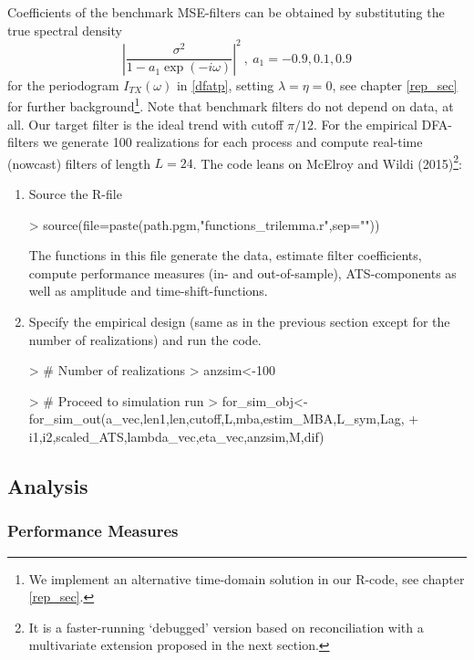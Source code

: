 \documentclass[a4paper]{book}
\begin{document}
Coefficients of the benchmark MSE-filters can be obtained by substituting the true spectral density
\[\left|\frac{\sigma^2}{1-a_1\exp(-i\omega)}\right|^2~,~a_1=-0.9,0.1,0.9\]
for the periodogram $I_{TX}(\omega)$ in \ref{dfatp}, setting $\lambda=\eta=0$, see chapter \ref{rep_sec} for further background\footnote{We implement an alternative time-domain solution in our R-code, see chapter \ref{rep_sec}.}. Note that benchmark filters do not depend on data, at all. Our target filter is the ideal trend with cutoff $\pi/12$.  
For the empirical DFA-filters we generate 100 realizations for each process and compute real-time (nowcast) filters of length $L=24$. The code leans on McElroy and Wildi (2015)\footnote{It is a faster-running `debugged' version based on reconciliation with a multivariate extension proposed in the next section.}:
\begin{enumerate}
\item Source the R-file
\begin{Schunk}
\begin{Sinput}
> source(file=paste(path.pgm,"functions_trilemma.r",sep=""))
\end{Sinput}
\end{Schunk}
The functions in this file generate the data, estimate filter coefficients, compute performance measures (in- and out-of-sample), ATS-components as well as amplitude and time-shift-functions. 
\item Specify the empirical design (same as in the previous section except for the number of realizations) and run the code. 
\begin{Schunk}
\begin{Sinput}
> # Number of realizations
> anzsim<-100
\end{Sinput}
\end{Schunk}
\begin{Schunk}
\begin{Sinput}
> # Proceed to simulation run
> for_sim_obj<-for_sim_out(a_vec,len1,len,cutoff,L,mba,estim_MBA,L_sym,Lag,
+                       i1,i2,scaled_ATS,lambda_vec,eta_vec,anzsim,M,dif)
\end{Sinput}
\end{Schunk}
\end{enumerate}

\subsection{Analysis}


\subsubsection{Performance Measures}
\end{document}
